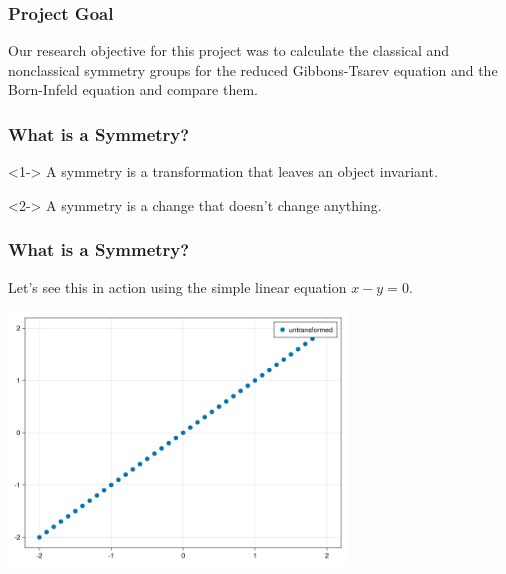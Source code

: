 \documentclass{beamer}
\begin{document}
\begin{frame}
    \frametitle{Project Goal}
    Our research objective for this project was to calculate the classical and nonclassical symmetry groups for the reduced Gibbons-Tsarev equation and the Born-Infeld equation and compare them.
\end{frame}



\begin{frame}
    \frametitle{What is a Symmetry?}
    \begin{definition}<1->
        A symmetry is a transformation that leaves an object invariant.
    \end{definition}
    \vspace*{0.5in}
    \begin{definition}<2->
        A symmetry is a change that doesn't change anything.
    \end{definition}
\end{frame}


\begin{frame}
    \frametitle{What is a Symmetry?}
    Let's see this in action using the simple linear equation $x-y=0$.\\
    \begin{center}
        \includegraphics[width=9cm]{y=x.png}
    \end{center}
\end{frame}
\end{document}
